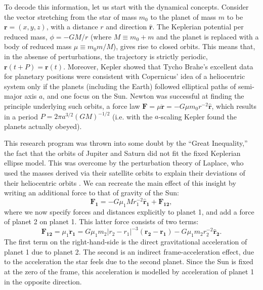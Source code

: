 \documentclass[graybox,natbib,nosecnum]{svmult}
\begin{document}
To decode this information, let us start with the dynamical concepts.  Consider the vector stretching from the star of mass $m_0$ to the planet of mass $m$ to be $\mathbf{r}=(x,y,z)$, with a distance $r$ and direction $\mathbf{\hat r}$.  The Keplerian potential per reduced mass, $\phi=-GM/r$ (where $M \equiv m_0 + m$ and the planet is replaced with a body of reduced mass $\mu \equiv m_0 m /M$), gives rise to closed orbits.  This means that, in the absense of perturbations, the trajectory is strictly periodic, $\mathbf{r}(t+P) = \mathbf{r}(t)$.  Moreover, Kepler showed that Tycho Brahe's excellent data for planetary positions were consistent with Copernicus' idea of a heliocentric system only if the planets (including the Earth) followed elliptical paths of semi-major axis $a$, and one focus on the Sun. Newton was successful at finding the principle underlying such orbits, a force law $\mathbf{F} = \mu \mathbf{\ddot r} =-G \mu m_0 r^{-2} \mathbf{\hat r}$, which results in a period $P = 2 \pi a^{3/2} (GM)^{-1/2}$ (i.e. with the $a$-scaling Kepler found the planets actually obeyed).

This research program was thrown into some doubt by the ``Great Inequality,'' the fact that the orbits of Jupiter and Saturn did not fit the fixed Keplerian ellipse model.  This was overcome by the perturbation theory of Laplace, who used the masses derived via their satellite orbits to explain their deviations of their heliocentric orbits \citep{1985Wilson}.  We can recreate the main effect of this insight by writing an additional force to that of gravity of the Sun: 
\begin{equation}
\mathbf{F_{1}} = -G \mu_1 M r_{1}^{-2} \mathbf{\hat r_{1}} + \mathbf{F_{12}},
\end{equation}
where we now specify forces and distances explicitly to planet 1, and add a force of planet 2 on planet 1.  This latter force consists of two terms: 
\begin{equation}
\mathbf{F_{12}} = \mu_1 \mathbf{\ddot r_1} = G \mu_1 m_2 \vert r_{2}-r_{1}\vert^{-3} (\mathbf{r_{2}} - \mathbf{r_{1}}) - G \mu_1 m_2 r_{2}^{-2} \mathbf{\hat r_{2}}.
\end{equation}
The first term on the right-hand-side is the direct gravitational acceleration of planet 1 due to planet 2.  The second is an indirect frame-acceleration effect, due to the acceleration the star feels due to the second planet.  Since the Sun is fixed at the zero of the frame, this acceleration is modelled by acceleration of planet 1 in the opposite direction.
\end{document}
